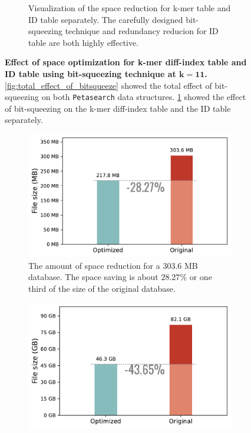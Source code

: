 \begin{figpage}
\begin{figure}
\begin{subfigure}{0.5\textwidth}
      \caption{Visualization of the space reduction for k-mer table and ID table separately.
        The carefully designed bit-squeezing technique and redundancy reducion for ID table are both highly effective.}
      \label{fig:separate_effect_of_bitsqueeze}
    \end{subfigure}
    \caption{\textbf{Effect of space optimization for k-mer diff-index table and ID table using bit-squeezing technique at $\mathbf{k = 11}$.} \cref{fig:total_effect_of_bitsqueeze} showed the total effect of bit-squeezing on both \texttt{Petasearch} data structures.
      \cref{fig:separate_effect_of_bitsqueeze} showed the effect of bit-squeezing on the k-mer diff-index table and the ID table separately.}
    \label{fig:space_opt}
  \end{figure}
  \begin{figure}
    \begin{subfigure}{0.5\textwidth}
      \centering
      \includegraphics[width=\textwidth]{images/seqdbsize_small.pdf}
      \caption{The amount of space reduction for a 303.6 MB database. The space saving is about $28.27\%$ or one third of the size of the original database.}
      \label{fig:seqdbsize_small}
    \end{subfigure}
    \begin{subfigure}{0.5\textwidth}
      \centering
      \includegraphics[width=\textwidth]{images/seqdbsize_large.pdf}

\end{subfigure}
\end{figure}
\end{figpage}
